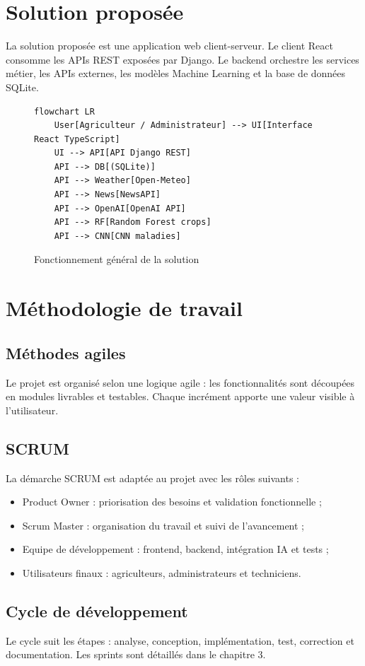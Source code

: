 \section{Solution proposée}
La solution proposée est une application web client-serveur. Le client React consomme les APIs REST exposées par Django. Le backend orchestre les services métier, les APIs externes, les modèles Machine Learning et la base de données SQLite.

\begin{figure}[H]
\centering
\caption{Fonctionnement général de la solution}
\begin{lstlisting}[language=mermaid]
flowchart LR
    User[Agriculteur / Administrateur] --> UI[Interface React TypeScript]
    UI --> API[API Django REST]
    API --> DB[(SQLite)]
    API --> Weather[Open-Meteo]
    API --> News[NewsAPI]
    API --> OpenAI[OpenAI API]
    API --> RF[Random Forest crops]
    API --> CNN[CNN maladies]
\end{lstlisting}
\end{figure}

\section{Méthodologie de travail}
\subsection{Méthodes agiles}
Le projet est organisé selon une logique agile : les fonctionnalités sont découpées en modules livrables et testables. Chaque incrément apporte une valeur visible à l'utilisateur.

\subsection{SCRUM}
La démarche SCRUM est adaptée au projet avec les rôles suivants :
\begin{itemize}[noitemsep]
  \item Product Owner : priorisation des besoins et validation fonctionnelle ;
  \item Scrum Master : organisation du travail et suivi de l'avancement ;
  \item Equipe de développement : frontend, backend, intégration IA et tests ;
  \item Utilisateurs finaux : agriculteurs, administrateurs et techniciens.
\end{itemize}

\subsection{Cycle de développement}
Le cycle suit les étapes : analyse, conception, implémentation, test, correction et documentation. Les sprints sont détaillés dans le chapitre 3.
